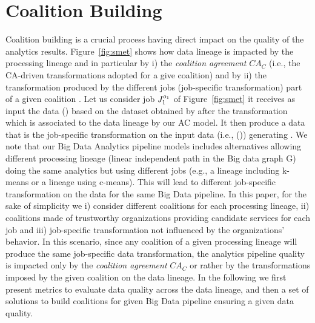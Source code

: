 \section{Coalition Building}\label{sec:coalition}
Coalition building is a crucial process having direct impact on the quality of the analytics results. Figure~\ref{fig:smet} shows how data lineage is impacted by the processing lineage and in particular by i) the \textit{coalition a\-greement} $\textit{CA}_C$ (i.e., the CA-driven transformations adopted for a give coalition) and by ii) the transformation produced by the different jobs (job-specific transformation) part of a given coalition \coalition{}.
Let us consider job $J_{1}^{o_{1}}$ of Figure~\ref{fig:smet} it receives as input the data () based on the dataset obtained by  after the transformation   which is associated to the data lineage by our AC model. It then produce a data that is the job-specific transformation on the input data (i.e., ()) generating .
We note that our Big Data Analytics pipeline models includes alternatives allowing different processing lineage (linear independent path in the Big data graph G) doing the same analytics but using different jobs (e.g., a lineage including k-means or a lineage using c-means). This will lead to different job-specific transformation on the data for the same Big Data pipeline.
In this paper, for the sake of simplicity we i) consider different coalitions for each processing lineage, ii) coalitions made of trustworthy organizations  providing candidate services for each job and iii) job-specific transformation not influenced by the organizations' behavior.  
In this scenario, since any coalition of a given processing lineage will produce the same job-specific data transformation, the analytics pipeline quality is impacted only by the \textit{coalition agreement} $\textit{CA}_C$ or rather by the transformations  imposed by the given coalition \coalition{} on the data lineage. 
In the following we first present metrics to evaluate data quality across the data lineage, and then a set of solutions to build coalitions for  given Big Data pipeline ensuring a given data quality.

